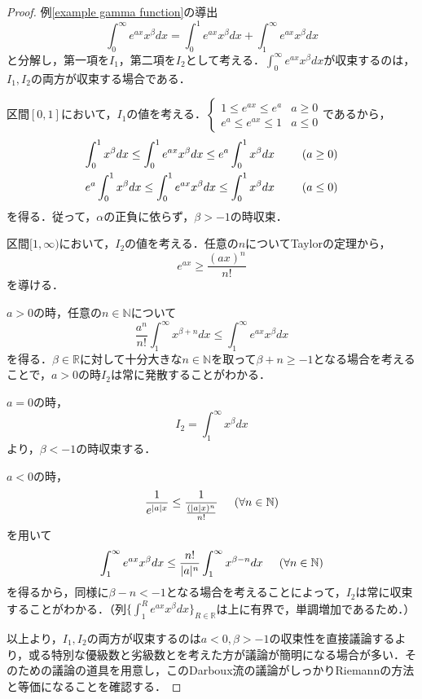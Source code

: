 \documentclass[uplatex, dvipdfmx]{jsreport}
\begin{document}
\begin{proof}{例\ref{example gamma function}の導出}
    $$\int^\infty_0 e^{ax}x^\beta dx = \int^1_0 e^{ax}x^\beta dx + \int^\infty_1 e^{ax}x^\beta dx$$と分解し，第一項を$I_1$，第二項を$I_2$として考える．$\int^\infty_0 e^{ax}x^\beta dx$が収束するのは，$I_1, I_2$の両方が収束する場合である．

    区間$[0,1]$において，$I_1$の値を考える．$
    \begin{cases}
        1\le e^{ax}\le e^a & a\ge 0\\
        e^a\le e^{ax}\le 1 & a\le 0
    \end{cases}$であるから，
    \begin{eqnarray*}
        \int^1_0x^\beta dx \le \int^1_0 e^{ax}x^\beta dx \le e^{a}\int^1_0 x^\beta dx &\hspace{5mm}& (a\ge 0)\\
        e^{a}\int^1_0 x^\beta dx \le \int^1_0 e^{ax}x^\beta dx \le \int^1_0 x^\beta dx &\hspace{5mm}& (a\le 0)
    \end{eqnarray*}を得る．従って，$\alpha$の正負に依らず，$\beta >-1$の時収束．

    区間$[1,\infty)$において，$I_2$の値を考える．任意の$n$についてTaylorの定理から，$$e^{ax}\ge\frac{(ax)^n}{n!}$$を導ける．

    $a>0$の時，任意の$n\in\mathbb{N}$について
    $$\frac{a^n}{n!} \int^\infty_1 x^{\beta+n} dx \le  \int^\infty_1 e^{ax}x^\beta dx$$を得る．$\beta\in\mathbb{R}$に対して十分大きな$n\in\mathbb{N}$を取って$\beta + n\ge -1$となる場合を考えることで，$a>0$の時$I_2$は常に発散することがわかる．

    $a=0$の時，$$I_2= \int^\infty_1 x^\beta dx$$より，$\beta < -1$の時収束する．

    $a<0$の時，$$\frac{1}{e^{|a|x}}\le\frac{1}{\frac{(|a|x)^n}{n!}}\hspace{5mm}(\forall n\in\mathbb{N})$$を用いて
    $$ \int^\infty_1 e^{ax}x^\beta dx \le \frac{n!}{|a|^n}\int^\infty_1 x^{\beta -n} dx\hspace{5mm}(\forall n\in\mathbb{N})$$
    を得るから，同様に$\beta -n <-1$となる場合を考えることによって，$I_2$は常に収束することがわかる．（列$\{\int^R_1 e^{ax}x^\beta dx\}_{R\in\mathbb{R}}$は上に有界で，単調増加であるため．）

    以上より，$I_1,I_2$の両方が収束するのは$a<0,\beta >-1$の収束性を直接議論するより，或る特別な優級数と劣級数とを考えた方が議論が簡明になる場合が多い．そのための議論の道具を用意し，このDarboux流の議論がしっかりRiemannの方法と等価になることを確認する．


\end{proof}
\end{document}
